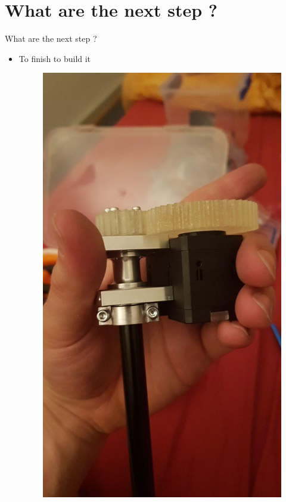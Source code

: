 \documentclass{beamer}
\begin{document}
\section{What are the next step ?}
\begin{frame}{What are the next step ?}
\begin{itemize}
\item To finish to build it
\begin{figure}
\includegraphics[scale=0.3]{pictures/build1}

\end{figure}
\end{itemize}
\end{frame}
\end{document}
